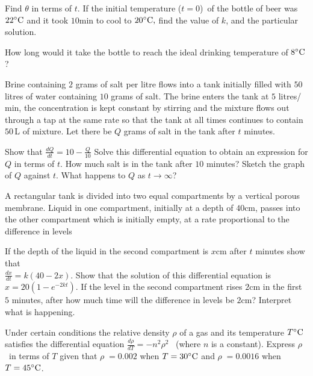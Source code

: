 \begin{Exercise}[title={Separable Equations},label=exSepEqns]
\begin{tasks}
	\task Find $\theta $ in terms of $t$.  If the initial temperature ($t =0$)\ of the bottle of beer was $22 \mbox{{\ensuremath{{}^\circ}}C}$ and it took $10 \mbox{min}$ to cool to $20 \mbox{{\ensuremath{{}^\circ}}C}\text{,}$ find the value of $k$, and the particular solution. 
	
	\task How long would it take the bottle to
	reach the ideal drinking temperature of $8 \mbox{{\ensuremath{{}^\circ}}C}$? \end{tasks}
\Question Brine containing $2$ grams of salt per litre flows into a tank initially filled with $50$ litres of water containing $10$ grams of salt.  The brine enters the tank at $5$ litres/$\mbox{min}$, the concentration is kept constant by stirring and the mixture flows out through a tap at the same rate so that the tank at all times continues to contain $50\,$L of mixture.  Let there be $Q$ grams of salt in the tank after $t$ minutes. 

\begin{tasks}
	\task Show that $\frac{d Q}{d t} =10 -\frac{Q}{10}$ 
	\task Solve this differential equation to obtain an expression for $Q$ in terms of $t$. 
	\task How much salt is in the tank after $10$ minutes? 
	\task Sketch the graph of $Q$ against $t$. 
	\task What happens to $Q$ as $t \rightarrow \infty $? \end{tasks}

\Question A rectangular tank is divided into two equal compartments by a vertical porous membrane.  Liquid in one compartment, initially at a depth of $40 \mbox{cm}$, passes into the other compartment which is initially empty, at a rate proportional to the difference in levels 

\begin{tasks}
	\task If the depth of the liquid in the second compartment is $x \mbox{cm}$ after $t$ minutes show that  \\\relax $\frac{d x}{d t} =k \left (40 -2 x\right )\text{.}$ 
	\task Show that the solution of this differential equation is $x =20 \left (1 -e^{ -2 k t}\right )\text{.}$ 
	\task If the level in the second compartment rises $2 \mbox{cm}$ in the first $5$ minutes, after how much time will the difference in levels be $2 \mbox{cm}$? 
	\task Interpret what is happening. \end{tasks}
\Question Under certain conditions the relative density $\rho $ of a gas and its temperature $T \mbox{{\ensuremath{{}^\circ}}C}$ satisfies the differential equation $\frac{d \rho }{d T} = -n^{2} \rho ^{2}$  \ (where $n$ is a constant).  Express $\rho $\ in terms of $T$ given that $\rho \; =0.002$ when $T =30 \mbox{{\ensuremath{{}^\circ}}C}$ and $\rho \; =0.0016$ when $T =45 \mbox{{\ensuremath{{}^\circ}}C}$. 

\end{Exercise}
